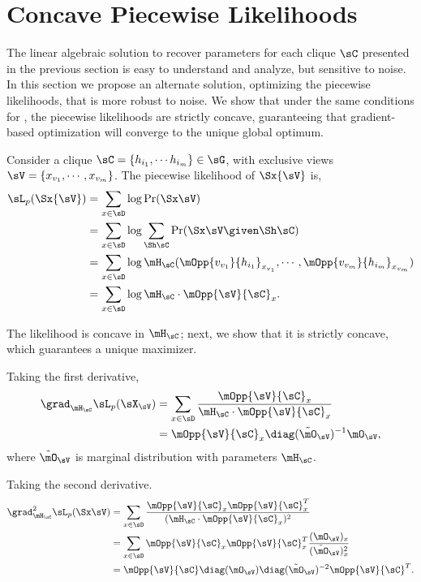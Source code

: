 \section{Concave Piecewise Likelihoods}
\label{sec:piecewise}

The linear algebraic solution to recover parameters for each clique
  $\sC$ presented in the previous section is easy to understand and
  analyze, but sensitive to noise. 
In this section we propose an alternate solution, optimizing the piecewise
  likelihoods, that is more robust to noise.
We show that under the same conditions for , the
  piecewise likelihoods are strictly concave, guaranteeing that
  gradient-based optimization will converge to the unique global
  optimum.

Consider a clique $\sC = \{h_{i_1}, \cdots h_{i_m}\} \in \sG$, with
  exclusive views $\sV = \{x_{v_1}, \cdots, x_{v_m}\}$. 
The piecewise likelihood of $\Sx{\sV}$ is,
\begin{align*}
  \sL_p(\Sx{\sV}) 
   &= \sum_{x \in \sD} \log \Pr( \Sx \sV ) \\
   &= \sum_{x \in \sD} \log \sum_{\Sh \sC} \Pr( \Sx \sV \given \Sh \sC ) \\
   &= \sum_{x \in \sD} \log \mH_\sC(\mOpp{v_{v_1}}{h_{i_1}}_{x_{v_1}}, \cdots, \mOpp{v_{v_m}}{h_{i_m}}_{x_{v_m}}) \\
   &= \sum_{x \in \sD} \log \mH_\sC \cdot \mOpp{\sV}{\sC}_x.
\end{align*}

The likelihood is concave in $\mH_\sC$; next, we show that it is
strictly concave, which guarantees a unique maximizer.
  
Taking the first derivative,
\begin{align}
  \grad_{\mH_\sC} \sL_p(\sX_\sV) 
  &= \sum_{x \in \sD} \frac{\mOpp{\sV}{\sC}_x}{\mH_\sC \cdot \mOpp{\sV}{\sC}_x} \nonumber \\ 
  &= \mOpp{\sV}{\sC}_x \diag(\tilde \mO_{\sV})^{-1} \mO_{\sV}, \label{eqn:lhood-grad}
\end{align}
  where $\tilde \mO_\sV$ is marginal distribution with parameters $\mH_\sC$.

Taking the second derivative.
\begin{align}
  \grad^2_{\mH_\sC} \sL_p(\Sx \sV) 
  &= \sum_{x \in \sD} \frac{\mOpp{\sV}{\sC}_x \mOpp{\sV}{\sC}_x^T}{(\mH_\sC \cdot \mOpp{\sV}{\sC}_x)^2} \nonumber \\
  &= \sum_{x \in \sD}\mOpp{\sV}{\sC}_x \mOpp{\sV}{\sC}_x^T \frac{(\mO_{\sV})_x}{(\tilde \mO_{\sV})^2_x} \nonumber \\
  &= \mOpp{\sV}{\sC} \diag(\mO_{\sV}) \diag(\tilde \mO_{\sV})^{-2} \mOpp{\sV}{\sC}^T. \label{eqn:lhood-hess}%
\end{align}

